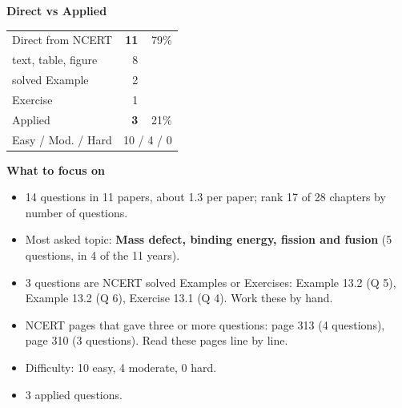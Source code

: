 \begin{minipage}[t]{0.34\linewidth}{\small\textbf{\color{crimson}Direct vs Applied}\par\smallskip
\begin{tabular}{@{}lrr@{}}\toprule
Direct from NCERT & \textbf{11} & 79\%\\
\quad text, table, figure & 8 &\\
\quad solved Example & 2 &\\
\quad Exercise & 1 &\\
Applied & \textbf{3} & 21\%\\\midrule
Easy / Mod. / Hard & \multicolumn{2}{r}{10 / 4 / 0}\\\bottomrule
\end{tabular}}\end{minipage}\hfill
\begin{minipage}[t]{0.63\linewidth}{\small\textbf{\color{crimson}What to focus on}\par\smallskip
\begin{itemize}[leftmargin=1.1em,itemsep=1pt,topsep=0pt]
\item 14 questions in 11 papers, about 1.3 per paper; rank 17 of 28 chapters by number of questions.
\item Most asked topic: \textbf{Mass defect, binding energy, fission and fusion} (5 questions, in 4 of the 11 years).
\item 3 questions are NCERT solved Examples or Exercises: Example 13.2 (Q 5), Example 13.2 (Q 6), Exercise 13.1 (Q 4). Work these by hand.
\item NCERT pages that gave three or more questions: page 313 (4 questions), page 310 (3 questions). Read these pages line by line.
\item Difficulty: 10 easy, 4 moderate, 0 hard.
\item 3 applied questions.
\end{itemize}}\end{minipage}\par
{}
